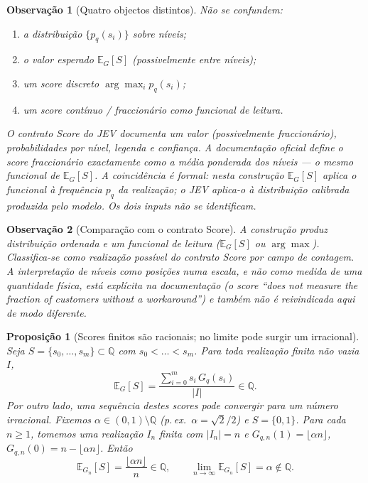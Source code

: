 \documentclass[11pt,a4paper]{article}
\newtheorem{proposicao}{Proposição}
\newtheorem{observacao}{Observação}
\begin{document}
\begin{observacao}[Quatro objectos distintos]
\label{obs:score-distincao}
Não se confundem:
\begin{enumerate}[leftmargin=1.5em]
\item a distribuição \(\{p_q(s_i)\}\) sobre níveis;
\item o valor esperado \(\mathbb E_G[S]\) (possivelmente entre níveis);
\item um score discreto \(\arg\max_i p_q(s_i)\);
\item um score contínuo / fraccionário como funcional de leitura.
\end{enumerate}
O contrato Score do JEV documenta um valor (possivelmente fraccionário),
probabilidades por nível, legenda e confiança. A documentação oficial define o
score fraccionário exactamente como a média ponderada dos níveis --- o mesmo
funcional de \(\mathbb E_G[S]\). A coincidência é formal: nesta construção
\(\mathbb E_G[S]\) aplica o funcional à frequência \(p_q\) da realização; o
JEV aplica-o à distribuição calibrada produzida pelo modelo. Os dois inputs
não se identificam.
\end{observacao}

\begin{observacao}[Comparação com o contrato Score]
\label{obs:score}
A construção produz distribuição ordenada e um funcional de leitura
(\(\mathbb E_G[S]\) ou \(\arg\max\)). Classifica-se como realização possível
do contrato Score por campo de contagem. A interpretação de níveis como \emph{posições} numa escala, e não como medida
de uma quantidade física, está explícita na documentação (o score ``does not
measure the fraction of customers without a workaround'') e também não é
reivindicada aqui de modo diferente.
\end{observacao}

\begin{proposicao}[Scores finitos são racionais; no limite pode surgir um irracional]
\label{prop:score-limite}
Seja \(S=\{s_0,\dots,s_m\}\subset\mathbb Q\) com \(s_0<\dots<s_m\). Para toda
realização finita não vazia \(I\),
\[
\boxed{
\mathbb E_G[S]
=
\frac{\sum_{i=0}^{m}s_i\,G_q(s_i)}{\lvert I\rvert}
\in\mathbb Q.
}
\]
Por outro lado, uma sequência destes scores pode convergir para um número
irracional. Fixemos \(\alpha\in(0,1)\setminus\mathbb Q\) (p.\,ex.\
\(\alpha=\sqrt2/2\)) e \(S=\{0,1\}\). Para cada \(n\ge1\), tomemos uma
realização \(I_n\) finita com \(\lvert I_n\rvert=n\) e
\(G_{q,n}(1)=\lfloor\alpha n\rfloor\),
\(G_{q,n}(0)=n-\lfloor\alpha n\rfloor\). Então
\[
\mathbb E_{G_n}[S]=\frac{\lfloor\alpha n\rfloor}{n}\in\mathbb Q,
\qquad
\lim_{n\to\infty}\mathbb E_{G_n}[S]=\alpha\notin\mathbb Q.
\]
\end{proposicao}
\end{document}
